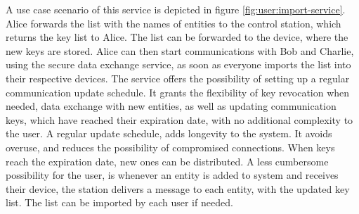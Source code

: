 A use case scenario of this service is depicted in figure \ref{fig:user:import-service}.
Alice forwards the list with the names of entities to the control station, which returns the key list to Alice. The list can be forwarded to the device, where the new keys are stored.
Alice can then start communications with Bob and Charlie, using the secure data exchange service, as soon as everyone imports the list into their respective devices.
The service offers the possibility of setting up a regular communication update schedule. It grants the flexibility of key revocation when needed, data exchange with new entities, as well as updating communication keys, which have reached their expiration date, with no additional complexity to the user.
A regular update schedule, adds longevity to the system. It avoids overuse, and reduces the possibility of compromised connections. When keys reach the expiration date, new ones can be distributed.
A less cumbersome possibility for the user, is whenever an entity is added to system and receives their device, the station delivers a message to each entity, with the updated key list. The list can be imported by each user if needed.







